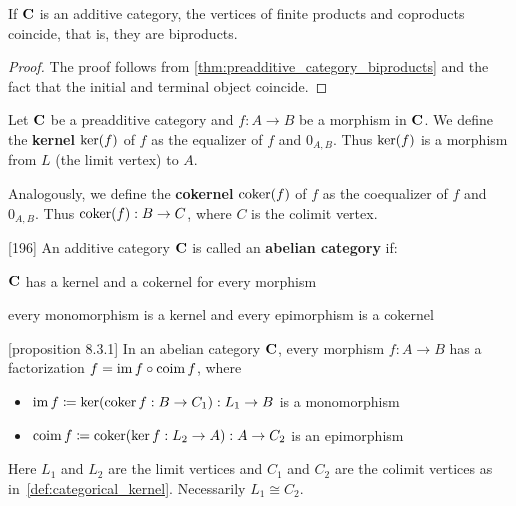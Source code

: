 \begin{theorem}\label{thm:additive_category_biproducts}
  If \( \operatorname{\mathbf{C}} \) is an additive category, the vertices of finite products and coproducts coincide, that is, they are biproducts.
\end{theorem}
\begin{proof}
  The proof follows from \cref{thm:preadditive_category_biproducts} and the fact that the initial and terminal object coincide.
\end{proof}

\begin{definition}\label{def:categorical_kernel}
  Let \( \operatorname{\mathbf{C}} \) be a preadditive category and \( f: A \to B \) be a morphism in \( \operatorname{\mathbf{C}} \). We define the \textbf{kernel} \( \operatorname{ker}(f) \) of \( f \) as the equalizer of \( f \) and \( 0_{A,B} \). Thus \( \operatorname{ker}(f) \) is a morphism from \( L \) (the limit vertex) to \( A \).

  Analogously, we define the \textbf{cokernel} \( \operatorname{coker}(f) \) of \( f \) as the coequalizer of \( f \) and \( 0_{A,B} \). Thus \( \operatorname{coker}(f): B \to C \), where \( C \) is the colimit vertex.
\end{definition}

\begin{definition}\label{def:abelian_category}\cite{MacLane1994}[196]
  An additive category \( \operatorname{\mathbf{C}} \) is called an \textbf{abelian category} if:
  \begin{defenum}
    \item \( \operatorname{\mathbf{C}} \) has a kernel and a cokernel for every morphism
    \item every monomorphism is a kernel and every epimorphism is a cokernel
  \end{defenum}
\end{definition}

\begin{proposition}\label{def:abelian_category_morphism_factorization}\cite{MacLane1994}[proposition 8.3.1]
  In an abelian category \( \operatorname{\mathbf{C}} \), every morphism \( f: A \to B \) has a factorization \( f = \operatorname{im} f \circ \operatorname{coim} f \), where
  \begin{itemize}
    \item \( \operatorname{im} f \coloneqq \operatorname{ker}(\operatorname{coker} f: B \to C_1): L_1 \to B \) is a monomorphism
    \item \( \operatorname{coim} f \coloneqq \operatorname{coker}(\operatorname{ker} f: L_2 \to A): A \to C_2 \) is an epimorphism
  \end{itemize}
  Here \( L_1 \) and \( L_2 \) are the limit vertices and \( C_1 \) and \( C_2 \) are the colimit vertices as in~\cref{def:categorical_kernel}. Necessarily \( L_1 \cong C_2 \).
\end{proposition}

